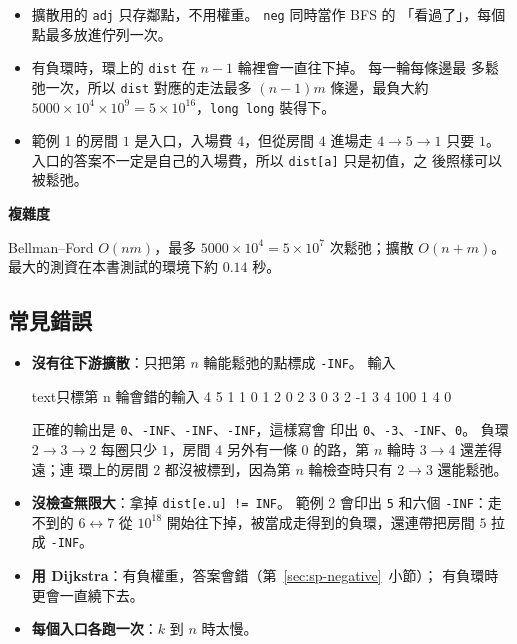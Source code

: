 
\begin{itemize}
\item 擴散用的 \texttt{adj} 只存鄰點，不用權重。 \texttt{neg} 同時當作 BFS 的
「看過了」，每個點最多放進佇列一次。
\item 有負環時，環上的 \texttt{dist} 在 $n - 1$ 輪裡會一直往下掉。 每一輪每條邊最
多鬆弛一次，所以 \texttt{dist} 對應的走法最多 $(n - 1)m$ 條邊，最負大約
$5000 \times 10^4 \times 10^9 = 5 \times 10^{16}$，\texttt{long long} 裝得下。
\item 範例 1 的房間 $1$ 是入口，入場費 $4$，但從房間 $4$ 進場走 $4 \to 5 \to 1$
只要 $1$。 入口的答案不一定是自己的入場費，所以 \texttt{dist[a]} 只是初值，之
後照樣可以被鬆弛。
\end{itemize}

\textbf{複雜度}

Bellman--Ford $O(nm)$，最多 $5000 \times 10^4 = 5 \times 10^7$ 次鬆弛；擴散
$O(n + m)$。 最大的測資在本書測試的環境下約 $0.14$ 秒。

\subsection{常見錯誤}

\begin{itemize}
\item \textbf{沒有往下游擴散}：只把第 $n$ 輪能鬆弛的點標成 \texttt{-INF}。 輸入
\begin{code}{text}{只標第 n 輪會錯的輸入}
4 5 1
1 0
1 2 0
2 3 0
3 2 -1
3 4 100
1 4 0
\end{code}
正確的輸出是 \texttt{0}、\texttt{-INF}、\texttt{-INF}、\texttt{-INF}，這樣寫會
印出 \texttt{0}、\texttt{-3}、\texttt{-INF}、\texttt{0}。 負環 $2 \to 3 \to 2$
每圈只少 $1$，房間 $4$ 另外有一條 $0$ 的路，第 $n$ 輪時 $3 \to 4$ 還差得遠；連
環上的房間 $2$ 都沒被標到，因為第 $n$ 輪檢查時只有 $2 \to 3$ 還能鬆弛。
\item \textbf{沒檢查無限大}：拿掉 \texttt{dist[e.u] != INF}。 範例 2 會印出
\texttt{5} 和六個 \texttt{-INF}：走不到的 $6 \leftrightarrow 7$ 從
$10^{18}$ 開始往下掉，被當成走得到的負環，還連帶把房間 $5$ 拉成
\texttt{-INF}。
\item \textbf{用 Dijkstra}：有負權重，答案會錯（第~\ref{sec:sp-negative}~小節）；
有負環時更會一直繞下去。
\item \textbf{每個入口各跑一次}：$k$ 到 $n$ 時太慢。
\end{itemize}

